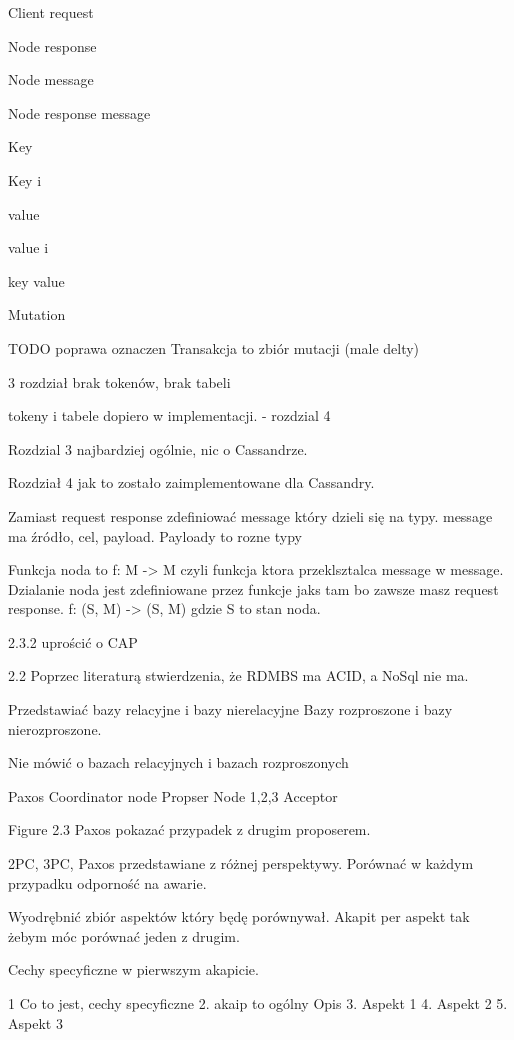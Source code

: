 Client request 

Node response 

Node message 

Node response message 

Key \key

Key i 

value \kvalue

value i 

key value \kv

Mutation 

TODO poprawa oznaczen
Transakcja to zbiór mutacji (male delty)

3 rozdział brak tokenów, brak tabeli

tokeny i tabele dopiero w implementacji.  - rozdzial 4

Rozdzial 3 najbardziej ogólnie, nic o Cassandrze.

Rozdział 4 jak to zostało zaimplementowane dla Cassandry.

Zamiast request response zdefiniować message który dzieli się na typy.
message ma źródło, cel, payload. Payloady to rozne typy

Funkcja noda to f: M -> M 
czyli funkcja ktora przeklsztalca message w message. 
Dzialanie noda jest zdefiniowane przez funkcje jaks tam bo zawsze masz request response.
f: (S, M) -> (S, M)
gdzie S to stan noda.

2.3.2 uprościć o CAP

2.2
Poprzec literaturą stwierdzenia, że RDMBS ma ACID, a NoSql nie ma.

Przedstawiać bazy relacyjne i bazy nierelacyjne
Bazy rozproszone i bazy nierozproszone.

Nie mówić o bazach relacyjnych i bazach rozproszonych

Paxos
Coordinator node Propser
Node 1,2,3 Acceptor

Figure 2.3 Paxos pokazać przypadek z drugim proposerem.

2PC, 3PC, Paxos przedstawiane z różnej perspektywy.
Porównać w każdym przypadku odporność na awarie.

Wyodrębnić zbiór aspektów który będę porównywał. 
Akapit per aspekt tak żebym móc porównać jeden z drugim.

Cechy specyficzne w pierwszym akapicie.

1 Co to jest, cechy specyficzne
2. akaip to ogólny Opis
3. Aspekt 1
4. Aspekt 2
5. Aspekt 3



